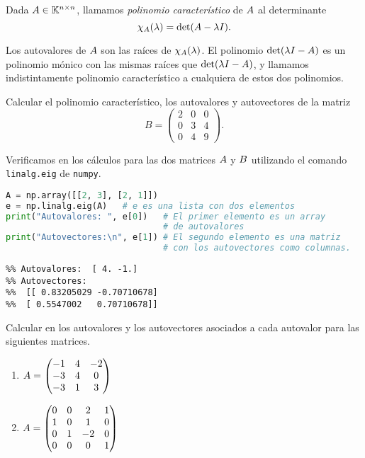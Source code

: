 \begin{defi}
Dada $\Ab \in  \Knn$, llamamos \emph{polinomio característico} de $\Ab$ al determinante
$$
\chi_{\Ab}(\lambda) = \det(\Ab - \lambda \Ib).
$$
\end{defi}

Los autovalores de $\Ab$ son las raíces de $\chi_{\Ab}(\lambda)$. El polinomio $\det(\lambda \Ib - \Ab)$ es un polinomio mónico con las mismas raíces que $\det(\lambda \Ib - \Ab)$, y llamamos indistintamente polinomio característico a cualquiera de estos dos polinomios.


\begin{ejercicio} Calcular el polinomio característico, los autovalores y autovectores de la matriz
$$B = \begin{pmatrix} 2 & 0 & 0 \\ 0 & 3 & 4 \\ 0 & 4 & 9 \end{pmatrix}.$$
\end{ejercicio}

\begin{ejemplo} Verificamos en \python los cálculos para las dos matrices $\Ab$ y
$\Bb$ utilizando el comando \texttt{linalg.eig} de \texttt{numpy}.

\begin{Shaded}
\begin{lstlisting}[language=python]
A = np.array([[2, 3], [2, 1]])
e = np.linalg.eig(A)   # e es una lista con dos elementos
print("Autovalores: ", e[0])   # El primer elemento es un array
                               # de autovalores
print("Autovectores:\n", e[1]) # El segundo elemento es una matriz
                               # con los autovectores como columnas.
\end{lstlisting}
\end{Shaded}

\begin{verbatim}
%% Autovalores:  [ 4. -1.]
%% Autovectores:
%%  [[ 0.83205029 -0.70710678]
%%  [ 0.5547002   0.70710678]]
\end{verbatim}
\end{ejemplo}

\begin{ejercicio} Calcular en \python los autovalores y los autovectores
asociados a cada autovalor para las siguientes matrices.

\begin{enumerate}
\item $\Ab =\begin{pmatrix} -1 & 4 & -2 \\ -3 & 4 & 0 \\ -3 & 1 & 3 \end{pmatrix}$
\item $\Ab = \begin{pmatrix} 0 & 0 & 2 & 1 \\ 1 & 0 & 1 & 0 \\ 0 & 1 & -2 & 0 \\ 0 & 0 & 0 & 1 \end{pmatrix}$
\end{enumerate}
\end{ejercicio}

